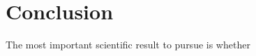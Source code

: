 \section{Conclusion}\label{sec4:Conclusion}

The most important scientific result to pursue is whether 